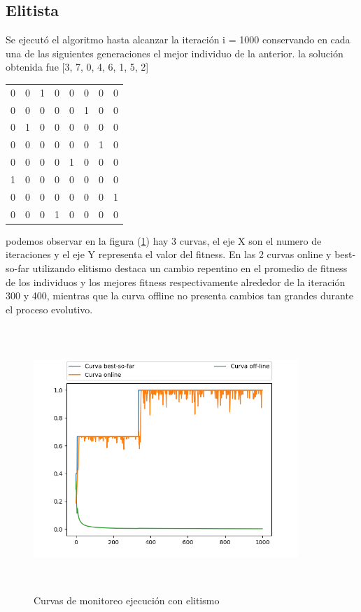\documentclass[11pt]{article}
\begin{document}
\subsection{Elitista}
Se ejecut\'o el algoritmo hasta alcanzar la iteraci\'on i = 1000  conservando en cada una de las siguientes
generaciones el mejor individuo de la anterior.
la soluci\'on obtenida fue [3, 7, 0, 4, 6, 1, 5, 2]
\begin{center}
\begin{tabular}{ c c c c c c c c }
	0 & 0 & 1 & 0 & 0 & 0 & 0 & 0\\
	0 & 0 & 0 & 0 & 0 & 1 & 0 & 0\\
	0 & 1 & 0 & 0 & 0 & 0 & 0 & 0\\
	0 & 0 & 0 & 0 & 0 & 0 & 1 & 0\\
	0 & 0 & 0 & 0 & 1 & 0 & 0 & 0\\
	1 & 0 & 0 & 0 & 0 & 0 & 0 & 0\\
	0 & 0 & 0 & 0 & 0 & 0 & 0 & 1\\
	0 & 0 & 0 & 1 & 0 & 0 & 0 & 0
\end{tabular}
\end{center}
podemos observar en la figura (\ref{elitismo}) hay 3 curvas, el eje X son el numero de iteraciones y el eje Y representa el valor del fitness. En las 2 curvas online y best-so-far utilizando elitismo destaca un cambio repentino en el promedio de fitness de los individuos y los mejores fitness respectivamente alrededor de la iteraci\'on 300 y 400, mientras que la curva offline no presenta cambios tan grandes durante el proceso evolutivo.
\begin{figure}[t]
    \includegraphics[width=10cm, height=10cm]{Figure_1}
    \centering
    \caption{Curvas de monitoreo ejecuci\'on con elitismo}
    \label{elitismo}
    \end{figure}
\end{document}
